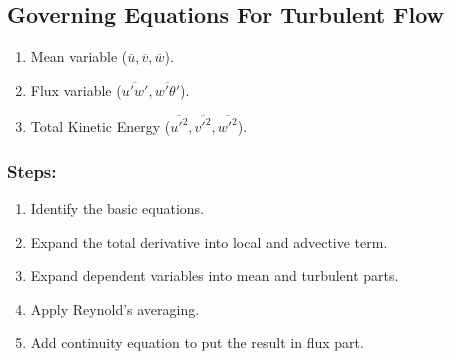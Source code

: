 \documentclass[fleqn,10pt]{SelfArx} %
\begin{document}
\subsection{Governing Equations For Turbulent Flow}
\begin{enumerate}[noitemsep]
	\item Mean variable ($\overline{u}, \overline{v},\overline{w}$).
	\item Flux variable ($\overline{u'w'}, \overline{w'\theta'}$).
	\item Total Kinetic Energy ($\overline{u'^2}, \overline{v'^2},\overline{w'^2}$).
\end{enumerate}

\subsubsection*{Steps:}
\begin{enumerate}[noitemsep]
	\item Identify the basic equations.
	\item Expand the total derivative into local and advective term.
	\item Expand dependent variables into mean and turbulent parts.
	\item Apply Reynold's averaging.
	\item Add continuity equation to put the result in flux part.
\end{enumerate}
\end{document}
